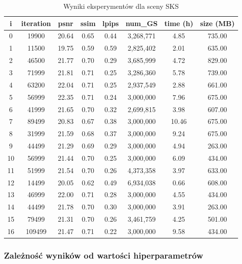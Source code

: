\begin{table}[!h]
    \centering
    \begin{tabular}{|c|c|c|c|c|c|c|c|}
    \hline
    i & iteration & psnr & ssim & lpips & num\_GS & time (h) & size (MB) \\
    \hline
    0 & 19900 & 20.64 & 0.65 & 0.44 & 3,268,771 & 4.85 & 735.00 \\
    \hline
    1 & 11500 & 19.75 & 0.59 & 0.59 & 2,825,402 & 2.01 & 635.00 \\
    \hline
    2 & 46500 & 21.77 & 0.70 & 0.29 & 3,685,999 & 4.72 & 829.00 \\
    \hline
    3 & 71999 & 21.81 & 0.71 & 0.25 & 3,286,360 & 5.78 & 739.00 \\
    \hline
    4 & 63200 & 22.04 & 0.71 & 0.25 & 2,937,549 & 2.88 & 661.00 \\
    \hline
    5 & 56999 & 22.35 & 0.71 & 0.24 & 3,000,000 & 7.96 & 675.00 \\
    \hline
    6 & 41999 & 21.65 & 0.70 & 0.32 & 2,699,815 & 3.98 & 607.00 \\
    \hline
    7 & 89499 & 20.83 & 0.67 & 0.38 & 3,000,000 & 10.46 & 675.00 \\
    \hline
    8 & 31999 & 21.59 & 0.68 & 0.37 & 3,000,000 & 9.24 & 675.00 \\
    \hline
    9 & 44499 & 21.29 & 0.69 & 0.29 & 3,000,000 & 4.94 & 263.00 \\
    \hline
    10 & 56999 & 21.44 & 0.70 & 0.25 & 3,000,000 & 6.09 & 434.00 \\
    \hline
    11 & 51999 & 21.54 & 0.70 & 0.26 & 4,373,358 & 3.97 & 633.00 \\
    \hline
    12 & 14499 & 20.05 & 0.62 & 0.49 & 6,934,038 & 0.66 & 608.00 \\
    \hline
    13 & 46999 & 22.00 & 0.71 & 0.28 & 3,000,000 & 4.55 & 434.00 \\
    \hline
    14 & 44499 & 21.78 & 0.70 & 0.30 & 3,000,000 & 3.91 & 263.00 \\
    \hline
    15 & 79499 & 21.31 & 0.70 & 0.26 & 3,461,759 & 4.25 & 501.00 \\
    \hline
    16 & 109499 & 21.47 & 0.71 & 0.22 & 3,000,000 & 9.58 & 434.00 \\
    \hline
    \end{tabular}
    \caption{Wyniki eksperymentów dla sceny SKS}
    \label{table:tab_res_sks}
\end{table}

\pagebreak

\subsubsection{Zależność wyników od wartości hiperparametrów}

